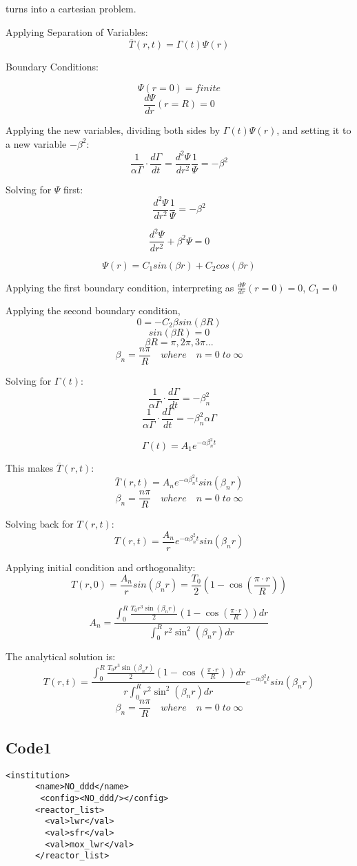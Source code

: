 \documentclass[12pt,letterpaper]{article}
\begin{document}
turns into a cartesian problem.

Applying Separation of Variables:
\[\overline{T}(r,t) = \Gamma (t) \Psi (r)  \]

Boundary Conditions:

\[\Psi(r = 0) = finite \]
\[\frac{d\Psi}{dr} (r = R) = 0 \]

Applying the new variables, dividing both sides by $\Gamma (t) \Psi (r) $,
and setting it to a new variable $ -\beta^2 $:
\[\frac{1}{\alpha  \Gamma} \cdot \frac{d\Gamma}{dt} = \frac{d^2 \Psi}{dr^2} \frac{1}{\Psi} = -\beta^2 \] 

Solving for $\Psi$ first:
\[\frac{d^2 \Psi}{dr^2} \frac{1}{\Psi} = -\beta^2 \]

\[\frac{d^2 \Psi}{dr^2} + \beta^2 \Psi = 0 \]

\[\Psi (r) = C_1 sin(\beta r) + C_2 cos(\beta r) \]

Applying the first boundary condition,
interpreting as $\frac{d\Psi}{dr} (r = 0) = 0$, $C_1 = 0 $

Applying the second boundary condition,
\[0 =  -C_2 \beta sin(\beta R) \]
\[sin(\beta R) = 0  \]
\[\beta R = \pi, 2\pi, 3\pi ... \]
\[\beta_n = \frac{n\pi}{R} \quad where \quad n = 0 \; to \; \infty \]

Solving for $\Gamma(t)$:
\[\frac{1}{\alpha  \Gamma} \cdot \frac{d\Gamma}{dt} = -\beta_n^2 \]
\[\frac{1}{\alpha  \Gamma} \cdot \frac{d\Gamma}{dt} = -\beta_n^2 \alpha \Gamma \]

\[\Gamma(t) = A_1 e^{-\alpha \beta_n^2 t }\]

This makes $\overline{T}(r,t)$:
\[\overline{T}(r,t) = A_n e^{-\alpha \beta_n^2 t} sin(\beta_n r)\]
\[\beta_n = \frac{n\pi}{R} \quad where \quad n = 0 \; to \; \infty \]

Solving back for $T(r,t)$:
\[T(r,t) = \frac{A_n}{r} e^{-\alpha \beta_n^2 t} sin(\beta_n r)\]

Applying initial condition and orthogonality:
\[T(r,0) = \frac{A_n}{r} sin(\beta_n r) = \frac{T_0}{2} (1-\cos{(\frac{\pi \cdot r}{R})}) \]

\[A_n = \frac{\int_{0}^{R} \frac{T_0 r^3 \sin(\beta_n r)}{2} (1-\cos{(\frac{\pi \cdot r}{R})}) dr}{\int_{0}^{R} r^2 \sin^{2}(\beta_n r) dr}\]

The analytical solution is:
\[T(r,t) = \frac{\int_{0}^{R} \frac{T_0 r^3 \sin(\beta_n r)}{2} (1-\cos{(\frac{\pi \cdot r}{R})}) dr}{r \int_{0}^{R} r^2 \sin^{2}(\beta_n r) dr} e^{-\alpha \beta_n^2 t} sin(\beta_n r)\]
\[\beta_n = \frac{n\pi}{R} \quad where \quad n = 0 \; to \; \infty \]

\subsection{Code1}
\begin{verbatim}
<institution>
      <name>NO_ddd</name>
       <config><NO_ddd/></config>
      <reactor_list>
        <val>lwr</val>
        <val>sfr</val>
        <val>mox_lwr</val>
      </reactor_list>
\end{verbatim}
\end{document}
